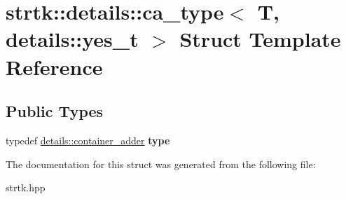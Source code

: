 \hypertarget{structstrtk_1_1details_1_1ca__type_3_01T_00_01details_1_1yes__t_01_4}{\section{strtk\-:\-:details\-:\-:ca\-\_\-type$<$ T, details\-:\-:yes\-\_\-t $>$ Struct Template Reference}
\label{structstrtk_1_1details_1_1ca__type_3_01T_00_01details_1_1yes__t_01_4}
}
\subsection*{Public Types}
\begin{DoxyCompactItemize}
\item 
\hypertarget{structstrtk_1_1details_1_1ca__type_3_01T_00_01details_1_1yes__t_01_4_a8fd647d421fe3f66b17bb60fa9fce174}{typedef \hyperlink{classstrtk_1_1details_1_1container__adder}{details\-::container\-\_\-adder} {\bfseries type}}\label{structstrtk_1_1details_1_1ca__type_3_01T_00_01details_1_1yes__t_01_4_a8fd647d421fe3f66b17bb60fa9fce174}

\end{DoxyCompactItemize}


The documentation for this struct was generated from the following file\-:\begin{DoxyCompactItemize}
\item 
strtk.\-hpp\end{DoxyCompactItemize}
